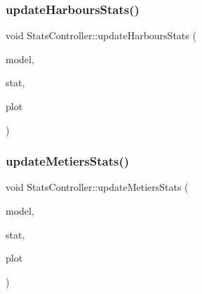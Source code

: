 \subsubsection{\texorpdfstring{updateHarboursStats()}{updateHarboursStats()}}
{\footnotesize\ttfamily void Stats\+Controller\+::update\+Harbours\+Stats (\begin{DoxyParamCaption}\item[{\mbox{\hyperlink{class_displace_model}{Displace\+Model}} $\ast$}]{model,  }\item[{\mbox{\hyperlink{namespacedisplace_1_1plot_a006fcde9bb7e602d977226ff75cb67aa}{displace\+::plot\+::\+Harbours\+Stat}}}]{stat,  }\item[{\mbox{\hyperlink{class_q_custom_plot}{Q\+Custom\+Plot}} $\ast$}]{plot }\end{DoxyParamCaption})\hspace{0.3cm}{\ttfamily [protected]}}

\mbox{\label{class_stats_controller_ae34808c08e1ad8834ec34329f7fa77c5}} 
\subsubsection{\texorpdfstring{updateMetiersStats()}{updateMetiersStats()}}
{\footnotesize\ttfamily void Stats\+Controller\+::update\+Metiers\+Stats (\begin{DoxyParamCaption}\item[{\mbox{\hyperlink{class_displace_model}{Displace\+Model}} $\ast$}]{model,  }\item[{\mbox{\hyperlink{namespacedisplace_1_1plot_a673bbc813b7f03be3dc76ae7fd087516}{displace\+::plot\+::\+Metiers\+Stat}}}]{stat,  }\item[{\mbox{\hyperlink{class_q_custom_plot}{Q\+Custom\+Plot}} $\ast$}]{plot }\end{DoxyParamCaption})\hspace{0.3cm}{\ttfamily [protected]}}

\mbox{\label{class_stats_controller_a180c3597c4cc31173c118e30be485072}} 
